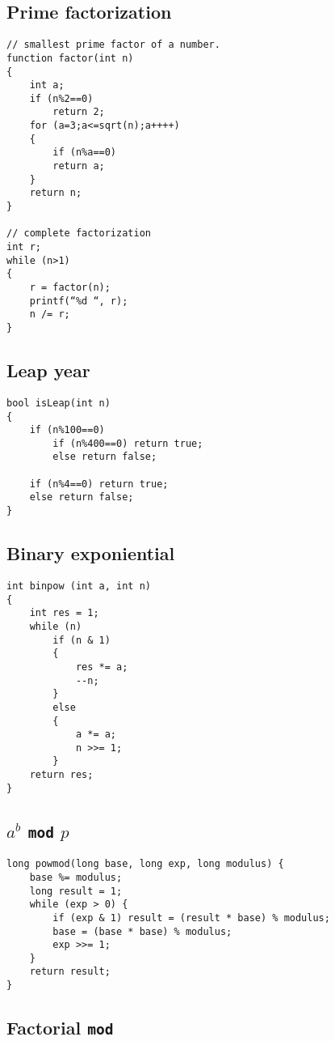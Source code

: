 \documentclass[a4paper]{article}
\begin{document}
\subsection{Prime factorization}

\begin{verbatim}
// smallest prime factor of a number.
function factor(int n)
{
    int a;
    if (n%2==0)
        return 2;
    for (a=3;a<=sqrt(n);a++++)
    {
		if (n%a==0)
		return a;
	}
	return n;
}

// complete factorization
int r;
while (n>1)
{
    r = factor(n);
    printf(“%d “, r);
    n /= r;
}
\end{verbatim}

\subsection{Leap year}

\begin{verbatim}
bool isLeap(int n)
{
	if (n%100==0)
		if (n%400==0) return true;
		else return false;

	if (n%4==0) return true;
	else return false;
}
\end{verbatim}

\subsection{Binary exponiential}

\begin{verbatim}
int binpow (int a, int n)
{
	int res = 1;
	while (n)
		if (n & 1)
		{
			res *= a;
			--n;
		}
		else
		{
			a *= a;
			n >>= 1;
		}
	return res;
}
\end{verbatim}

\subsection{$a^b$ \texttt{mod} $p$}
\begin{verbatim}
long powmod(long base, long exp, long modulus) {
	base %= modulus;
	long result = 1;
	while (exp > 0) {
		if (exp & 1) result = (result * base) % modulus;
		base = (base * base) % modulus;
		exp >>= 1;
	}
	return result;
}
\end{verbatim}

\subsection{Factorial \texttt{mod}}
\end{document}
